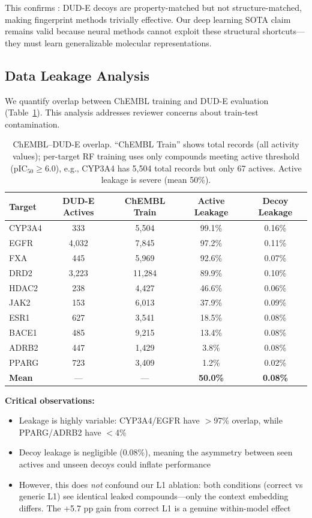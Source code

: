 \documentclass{article}
\begin{document}
This confirms \citet{wallach_2018_dude_bias}: DUD-E decoys are property-matched but not structure-matched, making fingerprint methods trivially effective. Our deep learning SOTA claim remains valid because neural methods cannot exploit these structural shortcuts---they must learn generalizable molecular representations.

\subsection{Data Leakage Analysis}

We quantify overlap between ChEMBL training and DUD-E evaluation (Table~\ref{tab:leakage}). This analysis addresses reviewer concerns about train-test contamination.

\begin{table}[h]
\caption{ChEMBL--DUD-E overlap. ``ChEMBL Train'' shows total records (all activity values); per-target RF training uses only compounds meeting active threshold (pIC$_{50} \geq 6.0$), e.g., CYP3A4 has 5,504 total records but only 67 actives. Active leakage is severe (mean 50\%).}
\label{tab:leakage}
\centering
\small
\begin{tabular}{@{}lcccc@{}}
\toprule
Target & DUD-E Actives & ChEMBL Train & Active Leakage & Decoy Leakage \\
\midrule
CYP3A4 & 333 & 5,504 & 99.1\% & 0.16\% \\
EGFR & 4,032 & 7,845 & 97.2\% & 0.11\% \\
FXA & 445 & 5,969 & 92.6\% & 0.07\% \\
DRD2 & 3,223 & 11,284 & 89.9\% & 0.10\% \\
HDAC2 & 238 & 4,427 & 46.6\% & 0.06\% \\
JAK2 & 153 & 6,013 & 37.9\% & 0.09\% \\
ESR1 & 627 & 3,541 & 18.5\% & 0.08\% \\
BACE1 & 485 & 9,215 & 13.4\% & 0.08\% \\
ADRB2 & 447 & 1,429 & 3.8\% & 0.08\% \\
PPARG & 723 & 3,409 & 1.2\% & 0.02\% \\
\midrule
\textbf{Mean} & --- & --- & \textbf{50.0\%} & \textbf{0.08\%} \\
\bottomrule
\end{tabular}
\end{table}

\textbf{Critical observations:}
\begin{itemize}[noitemsep,topsep=0pt]
\item Leakage is highly variable: CYP3A4/EGFR have $>$97\% overlap, while PPARG/ADRB2 have $<$4\%
\item Decoy leakage is negligible (0.08\%), meaning the asymmetry between seen actives and unseen decoys could inflate performance
\item However, this does \textit{not} confound our L1 ablation: both conditions (correct vs generic L1) see identical leaked compounds---only the context embedding differs. The +5.7 pp gain from correct L1 is a genuine within-model effect
\end{itemize}
\end{document}
